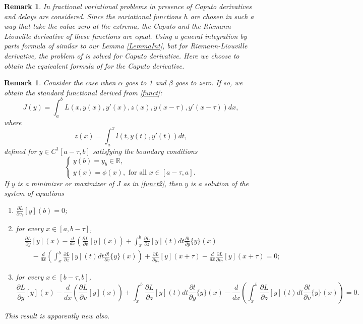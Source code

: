 \documentclass[10pt]{article}
\newtheorem{remark}[theorem]{Remark}
\begin{document}
\begin{remark} In \cite{Jarad} fractional variational problems in presence of Caputo derivatives and delays are considered. Since the variational functions $h$ are
chosen in such a way that take the value zero at the extrema, the Caputo and the Riemann-Liouville derivative of these functions  are equal.
Using a general integration by parts formula of \cite{Baleanu} similar to our Lemma \ref{LemmaInt}, but for Riemann-Liouville derivative, the problem of
\cite{Jarad} is solved for Caputo derivative. Here we choose to obtain the equivalent formula of  \cite{Baleanu} for the Caputo derivative.
\end{remark}

\begin{remark} Consider the case when $\alpha$ goes to 1 and $\beta$ goes to zero. If so, we obtain the standard functional derived from \eqref{funct}:
\begin{equation}
\label{funct2}
J(y)=\int_a^b L(x,y(x),y'(x),z(x), y(x-\tau), y'(x-\tau))dx,
\end{equation}
where
$$z(x)=\int_a^x l(t,y(t),y'(t))dt,$$
defined for $y\in C^1[a-\tau,b]$ satisfying the boundary conditions
$$\left\{
\begin{array}{l}
y(b)=y_b\in \mathbb R,\\
y(x)=\phi(x), \mbox{ for all } x\in [a-\tau,a].
\end{array}\right.$$
If $y$ is a minimizer or maximizer of $J$ as in \eqref{funct2}, then $y$ is a solution of the system of equations
\begin{enumerate}
\item $\displaystyle \frac{\partial L}{\partial v_\tau}[y](b)=0$;
\item for every $x\in[a,b-\tau]$,
\begin{align*}
&\frac{\partial L}{\partial y}[y](x)-\frac{d}{dx}\left( \frac{\partial L}{\partial v}[y](x) \right)
+\int_x^b \frac{\partial L}{\partial z}[y](t)dt  \frac{\partial l}{\partial y}\{y\}(x)\\
&\quad -\frac{d}{dx}\left(\int_x^b \frac{\partial L}{\partial z}[y](t)dt \frac{\partial l}{\partial v}\{y\}(x)\right)
+\frac{\partial L}{\partial y_\tau}[y](x+\tau) -\frac{d}{dx}\frac{\partial L}{\partial v_\tau}[y](x+\tau)=0;
\end{align*}
\item for every $x\in[b-\tau,b]$,
$$\frac{\partial L}{\partial y}[y](x)-\frac{d}{dx}\left(\frac{\partial L}{\partial v}[y](x) \right)
+\int_x^b \frac{\partial L}{\partial z}[y](t)dt \frac{\partial l}{\partial y}\{y\}(x)
-\frac{d}{dx}\left( \int_x^b \frac{\partial L}{\partial z}[y](t)dt \frac{\partial l}{\partial v}\{y\}(x)\right)=0.$$
\end{enumerate}
This result is apparently new also.
\end{remark}
\end{document}
